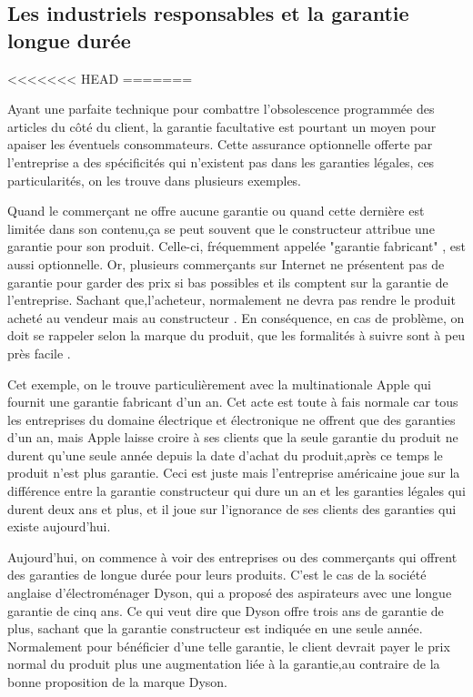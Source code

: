 \subsection{Les industriels responsables et la garantie longue durée}


<<<<<<< HEAD
\loremipsum
=======

Ayant une parfaite technique pour combattre l’obsolescence programmée des articles du côté du client, la garantie facultative est pourtant un moyen pour apaiser les éventuels consommateurs. Cette assurance optionnelle offerte par l'entreprise a des  spécificités qui n'existent pas dans les garanties légales, ces particularités, on les trouve dans plusieurs exemples.
 
Quand le commerçant ne offre aucune garantie ou quand cette dernière est limitée dans son contenu,ça se peut souvent que le constructeur attribue une garantie pour son produit. Celle-ci, fréquemment appelée "garantie fabricant" , est aussi optionnelle.
 Or, plusieurs commerçants sur Internet ne présentent pas de garantie pour  garder des prix si bas  possibles et ils comptent sur la garantie de l'entreprise. Sachant que,l'acheteur, normalement ne devra pas rendre le produit acheté au vendeur mais au constructeur . En conséquence, en cas de problème, on doit se rappeler selon la marque du produit, que les formalités à suivre sont à peu près facile .

Cet exemple, on le trouve particulièrement avec la multinationale Apple qui fournit une garantie fabricant d’un an. Cet acte est toute à fais normale car tous les entreprises du domaine électrique et électronique ne offrent que des garanties d’un an, mais Apple laisse croire à ses clients que la seule garantie du produit ne durent qu'une seule année depuis la date d'achat du produit,après ce temps le produit n'est plus garantie. Ceci est juste mais l'entreprise américaine joue sur la différence entre la garantie constructeur qui dure un an et les garanties légales qui durent deux ans et plus, et il joue sur l'ignorance de ses clients des garanties qui existe aujourd'hui.

Aujourd'hui, on commence à voir des entreprises ou des commerçants qui offrent des garanties de longue durée pour leurs produits.
 C'est le cas de la société anglaise d’électroménager Dyson, qui a proposé des aspirateurs avec une longue garantie de cinq ans. Ce qui veut dire que Dyson offre trois ans de garantie de plus, sachant que la garantie constructeur est indiquée en une seule année. Normalement pour bénéficier d'une telle garantie, le client devrait payer le prix normal du produit plus une augmentation liée à la garantie,au contraire de la bonne proposition de la marque Dyson. 


